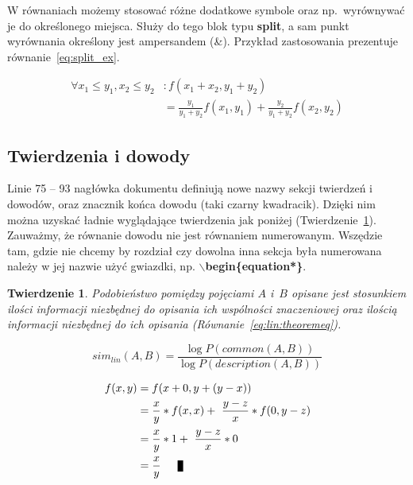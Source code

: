 \documentclass[twoside,a4paper]{book}
\newtheorem{theorem}{Twierdzenie}
\newenvironment{proof}[1][Dowód]{\begin{trivlist}
\item[\hskip \labelsep {\bfseries #1}]}{\end{trivlist}}
\newcommand{\qed}{\nobreak \ifvmode \relax \else
      \ifdim\lastskip<1.5em \hskip-\lastskip
      \hskip1.5em plus0em minus0.5em \fi \nobreak
      \vrule height0.75em width0.5em depth0.25em\fi}
\begin{document}
W równaniach możemy stosować różne dodatkowe symbole oraz np.\ wyrównywać je do określonego miejsca. Służy do tego blok typu \textbf{split}, a sam punkt wyrównania określony jest ampersandem (\&). Przykład zastosowania prezentuje równanie~\ref{eq:split_ex}.

\begin{equation}
  \label{eq:split_ex}
  \begin{split}
    \forall {x_1 \leq y_1, x_2 \leq y_2}&: f(x_1+x_2,y_1+y_2)\\ 
				  &= \frac{y_1}{y_1+y_2}f(x_1,y_1)+\frac{y_2}{y_1+y_2}f(x_2,y_2)
  \end{split}
\end{equation}

\subsection{Twierdzenia i dowody}

Linie 75 -- 93 nagłówka dokumentu definiują nowe nazwy sekcji twierdzeń i dowodów, oraz znacznik końca dowodu (taki czarny kwadracik). Dzięki nim można uzyskać ładnie wyglądające twierdzenia jak poniżej (Twierdzenie~\ref{eq:lin:theorem}). Zauważmy, że równanie dowodu nie jest równaniem numerowanym. Wszędzie tam, gdzie nie chcemy by rozdział czy dowolna inna sekcja była numerowana należy w jej nazwie użyć gwiazdki, np. \textbf{$\backslash$begin\{equation*\}}.

\begin{theorem}
 Podobieństwo pomiędzy pojęciami $A$ i~$B$ opisane jest stosunkiem ilości informacji niezbędnej do opisania ich wspólności znaczeniowej oraz ilością informacji niezbędnej do ich opisania (Równanie~\ref{eq:lin:theoremeq}).

 \begin{equation}
   sim_{lin}(A,B)=\frac{\log P(common(A,B))}{\log P(description(A,B))}
   \label{eq:lin:theoremeq}
 \end{equation}
 \label{eq:lin:theorem}
\end{theorem}

\begin{proof}
  \begin{equation*}
   \begin{split}
     f(x,y)&=f(x+0,y+(y-x))\\
	   &=\frac{x}{y}*f(x,x) +~\frac{y-z}{x}*f(0,y-z)\\
	   &=\frac{x}{y}*1 +~\frac{y-z}{x}*0\\
	   &=\frac{x}{y} \qed
   \end{split}
 \end{equation*}
\end{proof}
\end{document}
